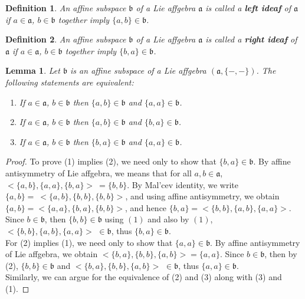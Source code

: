 \documentclass{article}
\newtheorem{definition}{Definition}[section]
\newtheorem{lemma}[theorem]{Lemma}
\theoremstyle{definition}
\theoremstyle{remark}
\theoremstyle{plain}
\begin{document}
\begin{definition}
    An affine subspace $\mathfrak{b}$ of a Lie affgebra $\mathfrak{a}$ is called a \textbf{left ideaf} of $\mathfrak{a}$ if $a\in \mathfrak{a}$, $b\in \mathfrak{b}$ together imply $\{a, b\}\in \mathfrak{b}$.
\end{definition}
\begin{definition}
    An affine subspace $\mathfrak{b}$ of a Lie affgebra $\mathfrak{a}$ is called a \textbf{right ideaf} of $\mathfrak{a}$ if $a\in \mathfrak{a}$, $b\in \mathfrak{b}$ together imply $\{b, a\}\in \mathfrak{b}$.
\end{definition}
\begin{lemma}\label{ideaf}
    Let $\mathfrak{b}$ is an affine subspace of a Lie affgebra $(\mathfrak{a},\{-, -\})$. The following statements are equivalent:
    \begin{enumerate}
        \item If $a \in \mathfrak{a}$, $b \in \mathfrak{b}$ then $\{a, b\} \in \mathfrak{b}$ and $\{a, a\} \in \mathfrak{b}$.
        \item If $a \in \mathfrak{a}$, $b \in \mathfrak{b}$ then $\{a, b\} \in \mathfrak{b}$ and $\{b, a\} \in \mathfrak{b}$.
        \item If $a \in \mathfrak{a}$, $b \in \mathfrak{b}$ then $\{b, a\} \in \mathfrak{b}$ and $\{a, a\} \in \mathfrak{b}$.
    \end{enumerate}
\end{lemma}
    \begin{proof}
        To prove (1) implies (2), we need only to show that $\{b, a\} \in \mathfrak{b}.$ By affine antisymmetry of Lie affgebra, we means that for all $a, b \in \mathfrak{a}$, $<\{a, b\}, \{a, a\}, \{b, a\}>~=\{b, b\}$. By Mal'cev identity, we write $\{a, b\}=~<\{a, b\}, \{b, b\}, \{b, b\}>$, and using affine antisymmetry, we obtain $\{a, b\}=<\{a, a\}, \{b, a\}, \{b, b\}>$, and hence $\{b, a\}=<\{b, b\}, \{a, b\}, \{a, a\}>.$ Since $b\in \mathfrak{b}$, then $\{b, b\}\in \mathfrak{b}$ using $(1)$ and also by $(1)$, $<\{b, b\}, \{a, b\}, \{a, a\}>$ $ \in \mathfrak{b}$, thus $\{b, a\} \in \mathfrak{b}$. \\
        For (2) implies (1), we need only to show that $\{a, a\} \in \mathfrak{b}.$ By affine antisymmetry of Lie affgebra, we obtain $<\{b, a\}, \{b, b\}, \{a, b\}>=\{a, a\}$. Since $b\in \mathfrak{b}$, then by (2), $\{b, b\}\in \mathfrak{b}$ and $<\{b, a\}, \{b, b\}, \{a, b\}>$ $\in \mathfrak{b}$, thus $\{a, a\} \in \mathfrak{b}.$\\
        Similarly, we can argue for the equivalence of (2) and (3) along with (3) and (1).
    \end{proof}
\end{document}
